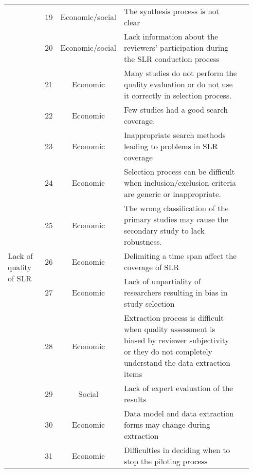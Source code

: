 \begin{table*}[!ht]
\begin{tabular}{|p{1.6cm}|c|c|p{7.5cm}|p{2.2cm}|}
 & 19 & Economic/social & The synthesis process is not clear & \cite{Budgen2018Reporting} \cite{Riaz2010} \\ \cline{2-5} 
 & 20 & Economic/social & Lack information about the reviewers' participation during the SLR conduction process & \cite{Budgen2018Reporting}\cite{Imtiaz2013}\cite{Riaz2010} \\ \hline
\multirow{11}{*}{\begin{minipage}{1.6cm} \centering Lack of quality of SLR \end{minipage}} & 21 & Economic & Many studies do not perform the quality evaluation or do not use it correctly in selection process. & \cite{Budgen2018Reporting} \cite{Riaz2010} \\ \cline{2-5} 
 & 22 & Economic & Few studies had a good search coverage. & \cite{Budgen2018Reporting} \\ \cline{2-5} 
 & 23 & Economic & Inappropriate search methods leading to problems in SLR coverage & \cite{Imtiaz2013}\cite{Zhou2016Threats} \\ \cline{2-5} 
 & 24 & Economic & Selection process can be difficult when inclusion/exclusion criteria are generic or inappropriate. & \cite{Ampatzoglou2019}\cite{Zhou2016Threats}  \\ \cline{2-5} 
 & 25 & Economic & The wrong classification of the primary studies may cause the secondary study to lack robustness. & \cite{Ampatzoglou2019}\cite{Riaz2010}\cite{Zhou2016Threats} \\ \cline{2-5} 
 & 26 & Economic & Delimiting a time span affect the coverage of SLR & \cite{Zhou2016Threats} \\ \cline{2-5} 
 & 27 & Economic & Lack of unpartiality of researchers resulting in bias in study selection & \cite{Zhou2016Threats} \\ \cline{2-5} 
 & 28 & Economic & Extraction process is difficult when quality assessment is biased by reviewer subjectivity or they do not completely understand the data extraction items & \cite{Ampatzoglou2019}\cite{Zhou2016Threats}  \\ \cline{2-5} 
 & 29 & Social & Lack of expert evaluation of the results & \cite{Kitchenham2013} \cite{Riaz2010} \cite{Zhou2016Threats} \\ \cline{2-5}
 & 30 & Economic & Data model and data extraction forms may change during extraction & \cite{Kitchenham2013} \\ \cline{2-5} 
 & 31 & Economic & Difficulties in deciding when to stop the piloting process & \cite{Riaz2010} \\ \hline
\end{tabular}
\end{table*}
